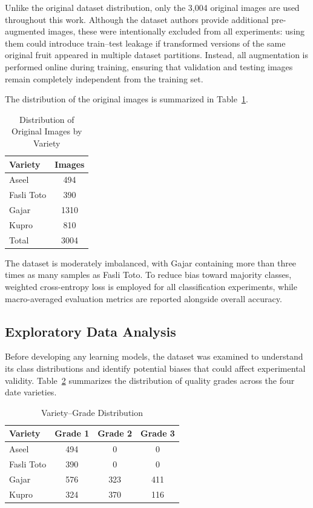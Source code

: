 \documentclass[conference]{IEEEtran}
\begin{document}
Unlike the original dataset distribution, only the 3{,}004 original images are used throughout this work. Although the dataset authors provide additional pre-augmented images, these were intentionally excluded from all experiments: using them could introduce train--test leakage if transformed versions of the same original fruit appeared in multiple dataset partitions. Instead, all augmentation is performed online during training, ensuring that validation and testing images remain completely independent from the training set.

The distribution of the original images is summarized in Table~\ref{tab:variety_dist}.

\begin{table}[htbp]
\caption{Distribution of Original Images by Variety}
\begin{center}
\begin{tabular}{lc}
\toprule
\textbf{Variety} & \textbf{Images} \\
\midrule
Aseel & 494 \\
Fasli Toto & 390 \\
Gajar & 1310 \\
Kupro & 810 \\
\midrule
Total & 3004 \\
\bottomrule
\end{tabular}
\label{tab:variety_dist}
\end{center}
\end{table}

The dataset is moderately imbalanced, with Gajar containing more than three times as many samples as Fasli Toto. To reduce bias toward majority classes, weighted cross-entropy loss is employed for all classification experiments, while macro-averaged evaluation metrics are reported alongside overall accuracy.

\subsection{Exploratory Data Analysis}
Before developing any learning models, the dataset was examined to understand its class distributions and identify potential biases that could affect experimental validity. Table~\ref{tab:confound} summarizes the distribution of quality grades across the four date varieties.

\begin{table}[htbp]
\caption{Variety--Grade Distribution}
\begin{center}
\begin{tabular}{lccc}
\toprule
\textbf{Variety} & \textbf{Grade 1} & \textbf{Grade 2} & \textbf{Grade 3} \\
\midrule
Aseel & 494 & 0 & 0 \\
Fasli Toto & 390 & 0 & 0 \\
Gajar & 576 & 323 & 411 \\
Kupro & 324 & 370 & 116 \\
\bottomrule
\end{tabular}
\label{tab:confound}
\end{center}
\end{table}
\end{document}
